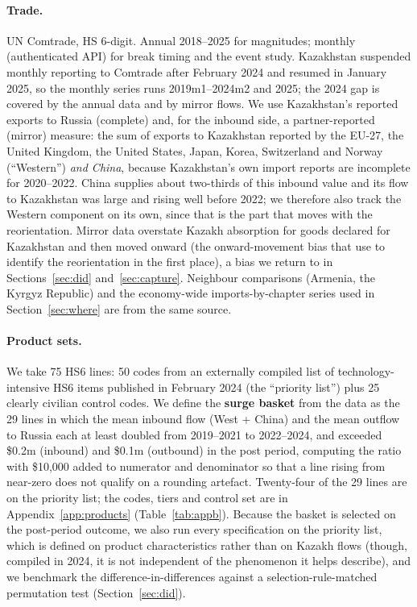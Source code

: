 \documentclass[12pt]{article}
\begin{document}
\paragraph{Trade.} UN Comtrade, HS 6-digit. Annual 2018--2025 for magnitudes; monthly
(authenticated API) for break timing and the event study. Kazakhstan suspended monthly
reporting to Comtrade after February 2024 and resumed in January 2025, so the monthly series
runs 2019m1--2024m2 and 2025; the 2024 gap is covered by the annual data and by mirror flows.
We use Kazakhstan's reported exports to Russia (complete) and, for the inbound side, a
partner-reported (mirror) measure:
the sum of exports to Kazakhstan reported by the EU-27, the United Kingdom, the United States,
Japan, Korea, Switzerland and Norway (``Western'') \emph{and China}, because Kazakhstan's own
import reports are incomplete for 2020--2022. China supplies about two-thirds of this inbound
value and its flow to Kazakhstan was large and rising well before 2022; we therefore also
track the Western component on its own, since that is the part that moves with the
reorientation. Mirror data overstate Kazakh absorption for goods declared for Kazakhstan and
then moved onward (the onward-movement bias that \citet{chupilkin2026roundabout} use to
identify the reorientation in the first place), a bias we return to in
Sections~\ref{sec:did} and~\ref{sec:capture}. Neighbour comparisons (Armenia, the Kyrgyz Republic) and the
economy-wide imports-by-chapter series used in Section~\ref{sec:where} are from the same
source.

\paragraph{Product sets.} We take 75 HS6 lines: 50 codes from an externally compiled list of
technology-intensive HS6 items published in February 2024 (the ``priority list'') plus 25
clearly civilian control codes. We define the \textbf{surge basket} from the data as the 29
lines in which the mean inbound flow (West + China) and the mean outflow to Russia each at
least doubled from 2019--2021 to 2022--2024, and exceeded \$0.2m (inbound) and \$0.1m
(outbound) in the post period, computing the ratio with \$10{,}000 added to numerator and
denominator so that a line rising from near-zero does not qualify on a rounding artefact.
Twenty-four of the 29 lines are on the priority list; the codes, tiers and control set are in
Appendix~\ref{app:products} (Table~\ref{tab:appb}). Because the basket is selected on the
post-period outcome, we also run every specification on the priority list, which is defined on
product characteristics rather than on Kazakh flows (though, compiled in 2024, it is not
independent of the phenomenon it helps describe), and we benchmark the difference-in-differences
against a selection-rule-matched permutation test (Section~\ref{sec:did}).
\end{document}
